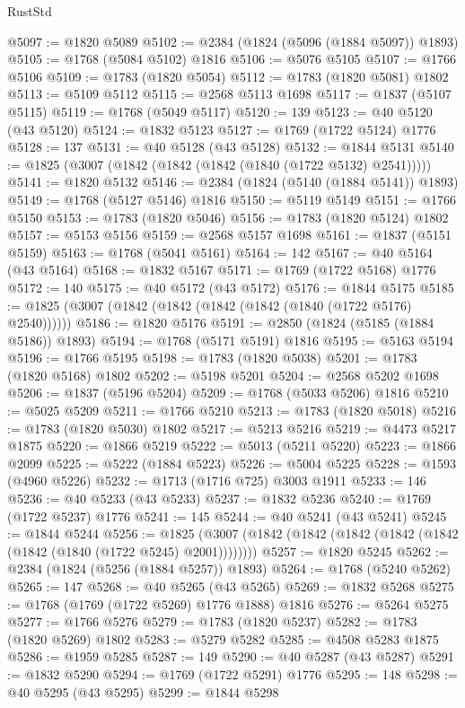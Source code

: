 \begin{lexlean}{RustStd}
\begin{coremodule}
{\begin{coremodule}
{{{{{{{{{{{{{{{{{{{{{{{{{{{{{{{{{{{{{{{{{{{{{{{@5097 := @1820 @5089
@5102 := @2384 (@1824 (@5096 (@1884 @5097)) @1893)
@5105 := @1768 (@5084 @5102) @1816
@5106 := @5076 @5105
@5107 := @1766 @5106
@5109 := @1783 (@1820 @5054)
@5112 := @1783 (@1820 @5081) @1802
@5113 := @5109 @5112
@5115 := @2568 @5113 @1698
@5117 := @1837 (@5107 @5115)
@5119 := @1768 (@5049 @5117)
@5120 := 139
@5123 := @40 @5120 (@43 @5120)
@5124 := @1832 @5123
@5127 := @1769 (@1722 @5124) @1776
@5128 := 137
@5131 := @40 @5128 (@43 @5128)
@5132 := @1844 @5131
@5140 := @1825 (@3007 (@1842 (@1842 (@1842 (@1840 (@1722 @5132) @2541)))))
@5141 := @1820 @5132
@5146 := @2384 (@1824 (@5140 (@1884 @5141)) @1893)
@5149 := @1768 (@5127 @5146) @1816
@5150 := @5119 @5149
@5151 := @1766 @5150
@5153 := @1783 (@1820 @5046)
@5156 := @1783 (@1820 @5124) @1802
@5157 := @5153 @5156
@5159 := @2568 @5157 @1698
@5161 := @1837 (@5151 @5159)
@5163 := @1768 (@5041 @5161)
@5164 := 142
@5167 := @40 @5164 (@43 @5164)
@5168 := @1832 @5167
@5171 := @1769 (@1722 @5168) @1776
@5172 := 140
@5175 := @40 @5172 (@43 @5172)
@5176 := @1844 @5175
@5185 := @1825 (@3007 (@1842 (@1842 (@1842 (@1842 (@1840 (@1722 @5176) @2540))))))
@5186 := @1820 @5176
@5191 := @2850 (@1824 (@5185 (@1884 @5186)) @1893)
@5194 := @1768 (@5171 @5191) @1816
@5195 := @5163 @5194
@5196 := @1766 @5195
@5198 := @1783 (@1820 @5038)
@5201 := @1783 (@1820 @5168) @1802
@5202 := @5198 @5201
@5204 := @2568 @5202 @1698
@5206 := @1837 (@5196 @5204)
@5209 := @1768 (@5033 @5206) @1816
@5210 := @5025 @5209
@5211 := @1766 @5210
@5213 := @1783 (@1820 @5018)
@5216 := @1783 (@1820 @5030) @1802
@5217 := @5213 @5216
@5219 := @4473 @5217 @1875
@5220 := @1866 @5219
@5222 := @5013 (@5211 @5220)
@5223 := @1866 @2099
@5225 := @5222 (@1884 @5223)
@5226 := @5004 @5225
@5228 := @1593 (@4960 @5226)
@5232 := @1713 (@1716 @725) @3003 @1911
@5233 := 146
@5236 := @40 @5233 (@43 @5233)
@5237 := @1832 @5236
@5240 := @1769 (@1722 @5237) @1776
@5241 := 145
@5244 := @40 @5241 (@43 @5241)
@5245 := @1844 @5244
@5256 := @1825 (@3007 (@1842 (@1842 (@1842 (@1842 (@1842 (@1842 (@1840 (@1722 @5245) @2001))))))))
@5257 := @1820 @5245
@5262 := @2384 (@1824 (@5256 (@1884 @5257)) @1893)
@5264 := @1768 (@5240 @5262)
@5265 := 147
@5268 := @40 @5265 (@43 @5265)
@5269 := @1832 @5268
@5275 := @1768 (@1769 (@1722 @5269) @1776 @1888) @1816
@5276 := @5264 @5275
@5277 := @1766 @5276
@5279 := @1783 (@1820 @5237)
@5282 := @1783 (@1820 @5269) @1802
@5283 := @5279 @5282
@5285 := @4508 @5283 @1875
@5286 := @1959 @5285
@5287 := 149
@5290 := @40 @5287 (@43 @5287)
@5291 := @1832 @5290
@5294 := @1769 (@1722 @5291) @1776
@5295 := 148
@5298 := @40 @5295 (@43 @5295)
@5299 := @1844 @5298
}}}}}}}}}}}}}}}}}}}}}}}}}}}}}}}}}}}}}}}}}}}}}}}
\end{coremodule}}
\end{coremodule}
\end{lexlean}
